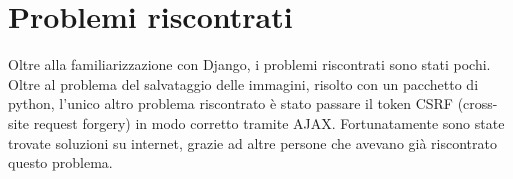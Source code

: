 \section{Problemi riscontrati}
Oltre alla familiarizzazione con Django, i problemi riscontrati sono stati pochi.
Oltre al problema del salvataggio delle immagini, risolto con un pacchetto di python,
l'unico altro problema riscontrato è stato passare il token CSRF (cross-site request forgery) in modo corretto tramite AJAX.
Fortunatamente sono state trovate soluzioni su internet, grazie ad altre persone che avevano già riscontrato questo problema.
